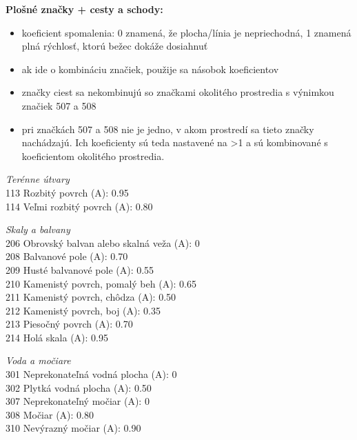 \documentclass[12pt,a4paper]{report}
\begin{document}
\textbf{Plošné značky + cesty a schody:}

\begin{itemize}
    \item koeficient spomalenia: 0 znamená, že plocha/línia je nepriechodná, 1 znamená plná rýchlosť, ktorú bežec dokáže dosiahnuť
    \item ak ide o kombináciu značiek, použije sa násobok koeficientov
    \item značky ciest sa nekombinujú so značkami okolitého prostredia s výnimkou značiek 507 a 508
    \item pri značkách 507 a 508 nie je jedno, v akom prostredí sa tieto značky nachádzajú. Ich koeficienty sú teda nastavené na >1 a sú kombinované s koeficientom okolitého prostredia.
\end{itemize}

\textit{Terénne útvary}\\
113 Rozbitý povrch (A): 0.95\\
114 Veľmi rozbitý povrch (A): 0.80

\textit{Skaly a balvany}\\
206 Obrovský balvan alebo skalná veža (A): 0\\
208 Balvanové pole (A): 0.70\\
209 Husté balvanové pole (A): 0.55\\
210 Kamenistý povrch, pomalý beh (A): 0.65\\
211 Kamenistý povrch, chôdza (A): 0.50\\
212 Kamenistý povrch, boj (A): 0.35\\
213 Piesočný povrch (A): 0.70\\
214 Holá skala (A): 0.95

\textit{Voda a močiare}\\
301 Neprekonateľná vodná plocha (A): 0\\
302 Plytká vodná plocha (A): 0.50\\
307 Neprekonateľný močiar (A): 0\\
308 Močiar (A): 0.80\\
310 Nevýrazný močiar (A): 0.90
\end{document}
